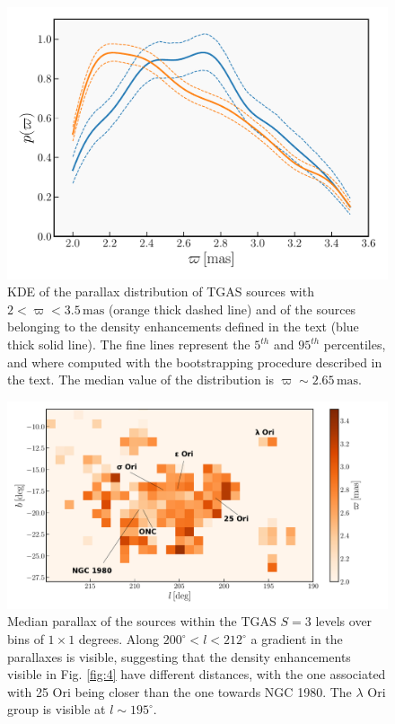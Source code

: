 \documentclass[onecolumn]{aa} %
\begin{document}
\begin{figure}
\includegraphics[width = \hsize, keepaspectratio]{fig5def.pdf}
\caption{KDE of the parallax distribution of TGAS sources with $2 < \varpi < 3.5 \, \mathrm{mas}$ (orange thick dashed line) and of the sources belonging to the density enhancements defined in the text (blue thick solid line). The fine lines represent the $5^{th}$ and $95^{th}$ percentiles, and where computed with the bootstrapping procedure described in the text. The median value of the distribution is $\varpi \sim 2.65 \, \mathrm{mas}.$}
\label{fig:5}
\end{figure}

\begin{figure}
\includegraphics[width = \textwidth]{fig6b_labels+small.pdf}
\caption{
Median parallax of the sources within the TGAS $S = 3$ levels over bins of $1\times 1$ degrees. Along $200^{\circ} < l < 212^{\circ}$ a gradient in the parallaxes is visible, suggesting that the density enhancements visible in Fig. \ref{fig:4} have different distances, with the one associated with 25 Ori being closer than the one towards  NGC 1980. The $\lambda$ Ori group is visible at $l \sim 195^{\circ}$.
}
\label{fig:13}
\end{figure}
\end{document}
